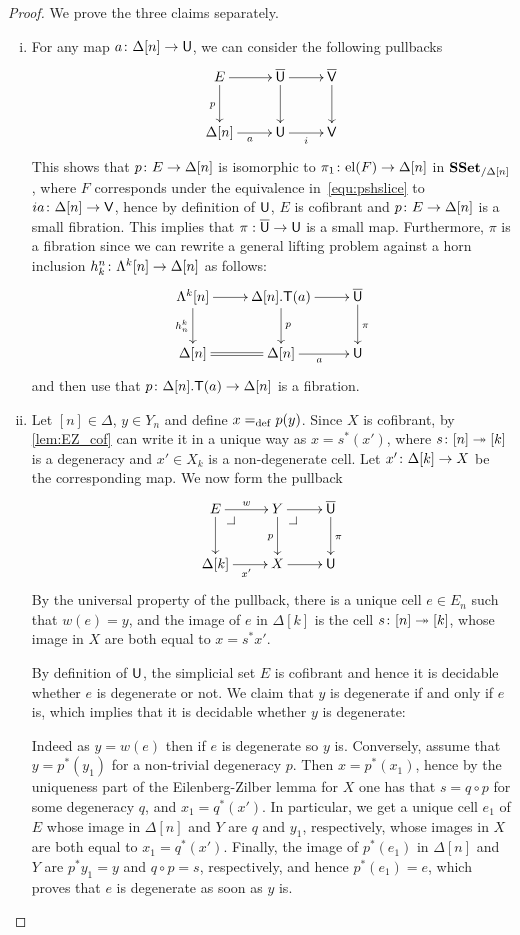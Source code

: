 \documentclass[reqno,10pt,a4paper,oneside,draft]{amsart}
\begin{document}
\begin{proof} We prove the three claims separately.
\begin{enumerate}[(i)] 
\item For any map $a \colon \Delta[n] \rightarrow \mathsf{U}$, we can consider the following pullbacks
\[
\xymatrix{
E \ar[r] \ar[d]_p  & \UU \ar[d] \ar[r]  & \VV \ar[d] \\
\Delta[n] \ar[r]_{a} & \U \ar[r]_{i} & \V }
\]
This shows that $p \colon E \rightarrow \Delta[n]$ is isomorphic to $\pi_1 \colon \mathrm{el}(F) \rightarrow \Delta[n]$ in $\mathbf{SSet}_{/ \Delta[n]}$, where $F$ corresponds under the equivalence in~\eqref{equ:pshslice} to 
$i a \colon \Delta[n] \rightarrow \mathsf{V}$, hence by definition of $\mathsf{U}$, $E$ is cofibrant and $p \colon E \rightarrow \Delta[n]$ is a small fibration. This implies that $\pi:\overline{\mathsf{U}} \rightarrow \mathsf{U}$ is a small map. Furthermore, $\pi$ is a fibration
since we can rewrite a general lifting problem against a horn inclusion $h^n_k \colon \Lambda^k[n] \rightarrow \Delta[n]$ as follows:
\[
\xymatrix{
\Lambda^k[n] \ar[r] \ar[d]_{h^k_n} & \Delta[n]. \mathsf{T}(a)  \ar[d]^{p} \ar[r] & \UU \ar[d]^\pi \\
\Delta[n] \ar@{=}[r]  & \Delta[n] \ar[r]_a & \U  }
\]
and then use that $p \colon \Delta[n]. \mathsf{T}(a)  \to \Delta[n]$ is a fibration.
\item  Let $[n] \in \Delta$, $y \in Y_n$ and define $x =_{\operatorname{def}} p(y)$. Since $X$ is cofibrant, by \cref{lem:EZ_cof} can write it in a unique way as $x=s^*(x')$, where $s \colon [n] \twoheadrightarrow [k]$ is a degeneracy and 
$x' \in X_k$ is a non-degenerate cell. Let $x' \colon \Delta[k] \rightarrow X$ be the corresponding map. We now form the pullback
\[
\xymatrix{
E \ar[r]^w \ar[d] \drpullback & Y \ar[r] \ar[d]_{p} \drpullback & \UU \ar[d]^\pi \\
\Delta[k] \ar[r]_{x'} & X \ar[r] & \U }
\]
By the universal property of the pullback, there is a unique cell $e \in E_n$ such that $w(e)=y$, and the image of $e$ in $\Delta[k]$ is the cell $s \colon [n] \twoheadrightarrow [k]$, whose image in $X$ are both equal to $x=s^* x'$.

By definition of $\mathsf{U}$, the simplicial set $E$ is cofibrant and hence it is decidable whether $e$ is degenerate or not. We claim that $y$ is degenerate if and only if $e$ is, which implies that it is decidable whether $y$ is degenerate:

Indeed as $y = w(e)$ then if $e$ is degenerate so $y$ is. Conversely, assume that $y=p^*(y_1)$ for a non-trivial degeneracy $p$. Then $x=p^*(x_1)$, hence by the uniqueness part of the Eilenberg-Zilber lemma for $X$ one has that $s=q \circ p$ for some degeneracy $q$, and $x_1 = q^*(x')$. In particular, we get a unique cell $e_1$ of $E$ whose image in $\Delta[n]$ and $Y$ are  $q$ and $y_1$, respectively, whose images in $X$ are both equal to $x_1=q^*(x')$. Finally, the image of $p^*(e_1)$ in $\Delta[n]$ and~$Y$ are  $p^* y_1 =y$ and $q \circ p =s$, respectively, and hence $p^*(e_1) =e$, which proves that $e$ is degenerate as soon as $y$ is.




\end{enumerate}
\end{proof}
\end{document}
